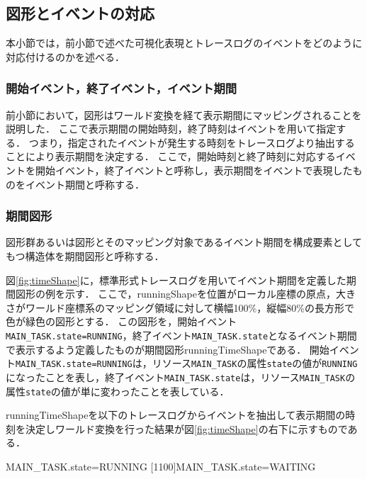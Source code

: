 \subsection{図形とイベントの対応}

本小節では，前小節で述べた可視化表現とトレースログのイベントをどのように対応付けるのかを述べる．

\subsubsection{開始イベント，終了イベント，イベント期間}
前小節において，図形はワールド変換を経て表示期間にマッピングされることを説明した．
ここで表示期間の開始時刻，終了時刻はイベントを用いて指定する．
つまり，指定されたイベントが発生する時刻をトレースログより抽出することにより表示期間を決定する．
ここで，開始時刻と終了時刻に対応するイベントを開始イベント，終了イベントと呼称し，表示期間をイベントで表現したものをイベント期間と呼称する．

\subsubsection{期間図形}
図形群あるいは図形とそのマッピング対象であるイベント期間を構成要素としてもつ構造体を期間図形と呼称する．

図\ref{fig:timeShape}に，標準形式トレースログを用いてイベント期間を定義した期間図形の例を示す．
ここで，runningShapeを位置がローカル座標の原点，大きさがワールド座標系のマッピング領域に対して横幅100\%，縦幅80\%の長方形で色が緑色の図形とする．
この図形を，開始イベント\verb|MAIN_TASK.state=RUNNING|，終了イベント\verb|MAIN_TASK.state|となるイベント期間で表示するよう定義したものが期間図形runningTimeShapeである．
開始イベント\verb|MAIN_TASK.state=RUNNING|は，リソース\verb|MAIN_TASK|の属性\verb|state|の値が\verb|RUNNING|になったことを表し，終了イベント\verb|MAIN_TASK.state|は，リソース\verb|MAIN_TASK|の属性\verb|state|の値が単に変わったことを表している．

runningTimeShapeを以下のトレースログからイベントを抽出して表示期間の時刻を決定しワールド変換を行った結果が図\ref{fig:timeShape}の右下に示すものである．

\begin{EBNF}
[1000]MAIN_TASK.state=RUNNING
[1100]MAIN_TASK.state=WAITING
\end{EBNF}

